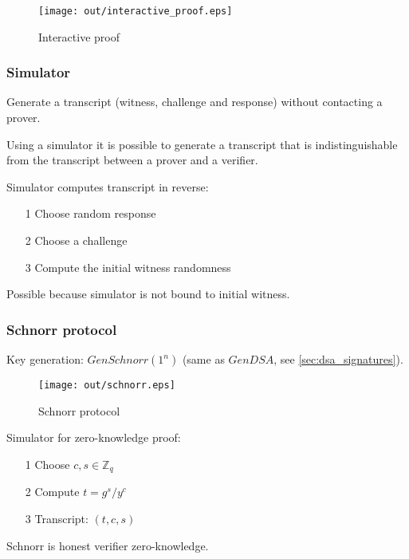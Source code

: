 \documentclass[a4paper]{article}
\begin{document}
\begin{figure}[h!]
  \centering
  \texttt{[image: out/interactive\_proof.eps]}
  \caption{Interactive proof}
  \label{fig:interactive_proof}
\end{figure}
\FloatBarrier

\subsubsection{Simulator}

Generate a transcript (witness, challenge and response) without contacting a
prover.

Using a simulator it is possible to generate a transcript that is
indistinguishable from the transcript between a prover and a verifier.

Simulator computes transcript in reverse:
\begin{enumerate}
  \item[1] Choose random response
  \item[2] Choose a challenge
  \item[3] Compute the initial witness randomness
\end{enumerate}

Possible because simulator is not bound to initial witness.

\subsubsection{Schnorr protocol}

Key generation: $GenSchnorr(1^{n})$ (same as $GenDSA$, see
\ref{sec:dsa_signatures}).

\begin{figure}[h!]
  \centering
  \texttt{[image: out/schnorr.eps]}
  \caption{Schnorr protocol}
  \label{fig:schnorr}
\end{figure}
\FloatBarrier

Simulator for zero-knowledge proof:
\begin{enumerate}
  \item[1] Choose $c, s \in \mathbb{Z}_{q}$
  \item[2] Compute $t = g^{s} / y^{c}$
  \item[3] Transcript: $(t, c, s)$
\end{enumerate}

Schnorr is honest verifier zero-knowledge.
\end{document}
